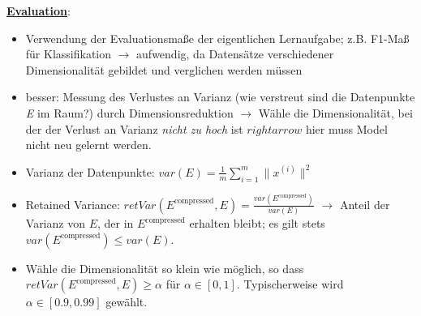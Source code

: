 \underline{\textbf{Evaluation}}:
\begin{itemize}
    \item Verwendung der Evaluationsmaße der eigentlichen Lernaufgabe; z.B. F1-Maß für Klassifikation $\rightarrow$ aufwendig, da Datensätze verschiedener Dimensionalität gebildet und verglichen werden müssen
    \item besser: Messung des Verlustes an Varianz (wie verstreut sind die Datenpunkte \emph{E} im Raum?) durch Dimensionsreduktion $\rightarrow$ Wähle die Dimensionalität, bei der der Verlust an Varianz \emph{nicht zu hoch} ist $rightarrow$ hier muss Model nicht neu gelernt werden.
    \item Varianz der Datenpunkte: $var(E)=\frac{1}{m}\sum_{i=1}^{m}\|x^{(i)}\|^2$
    \item Retained Variance: $retVar(E^\text{compressed}, E)=\frac{var(E^\text{compressed})}{var(E)}$ $\rightarrow$ Anteil der Varianz von $E$, der in $E^\text{compressed}$ erhalten bleibt; es gilt stets $var(E^\text{compressed})\leq var(E)$.
    \item Wähle die Dimensionalität so klein wie möglich, so dass $retVar(E^\text{compressed}, E) \geq  \alpha$ für $\alpha\in [0,1]$. Typischerweise wird $\alpha\in[0.9,0.99]$ gewählt.
\end{itemize}
